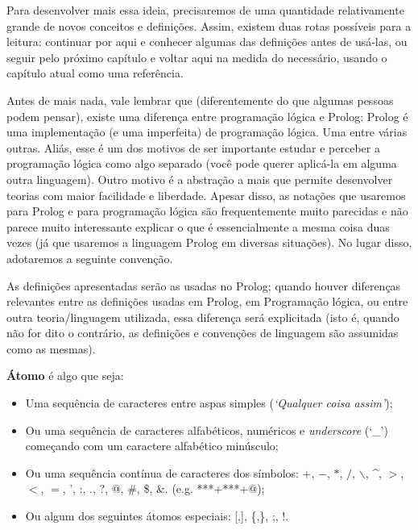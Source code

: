 \documentclass{article}
\begin{document}
Para desenvolver mais essa ideia, precisaremos de uma quantidade relativamente grande de novos conceitos e definições. Assim, existem duas rotas possíveis para a leitura: continuar por aqui e conhecer algumas das definições antes de usá-las, ou seguir pelo próximo capítulo e voltar aqui na medida do necessário, usando o capítulo atual como uma referência.


Antes de mais nada, vale lembrar que (diferentemente do que algumas pessoas podem pensar),
existe uma diferença entre programação lógica e Prolog: Prolog é uma implementação (e uma imperfeita) de programação lógica.
Uma entre várias outras. Aliás, esse é um dos motivos de ser importante estudar e perceber a programação lógica como algo separado (você pode querer aplicá-la em alguma outra linguagem). Outro motivo é a abstração a mais que permite desenvolver teorias com maior facilidade e liberdade. Apesar
disso, as notações que usaremos para Prolog e para programação lógica são frequentemente muito parecidas e não parece muito interessante explicar o que é essencialmente a mesma coisa duas vezes (já que usaremos a linguagem Prolog em diversas situações). No lugar disso, adotaremos a seguinte convenção.

As definições apresentadas serão as usadas no Prolog; quando houver diferenças relevantes entre as definições usadas em Prolog, em Programação lógica, ou entre outra teoria/linguagem utilizada, essa diferença será explicitada (isto é, quando não for dito o contrário, as definições e convenções de linguagem são assumidas como as mesmas).


  \theoremstyle{definition}
  \begin{definition} \textbf{Átomo} é algo que seja:
    \begin{itemize}
      \item Uma sequência de caracteres entre aspas simples (\textit{`Qualquer coisa assim'});
      \item Ou uma sequência de caracteres alfabéticos, numéricos e \textit{underscore} (`\_') começando com um caractere alfabético minúsculo;
      \item Ou uma sequência contínua de caracteres dos símbolos: $+$, $-$, $*$, $/$, $\backslash$, \^{}, $>$, $<$, $=$, ', :, ., ?, @, \#, \$, \&. (e.g. ***+***+@);
      \item Ou algum dos seguintes átomos especiais: [,], \{,\}, ;, !.
    \end{itemize}
  \end{definition}
\end{document}
